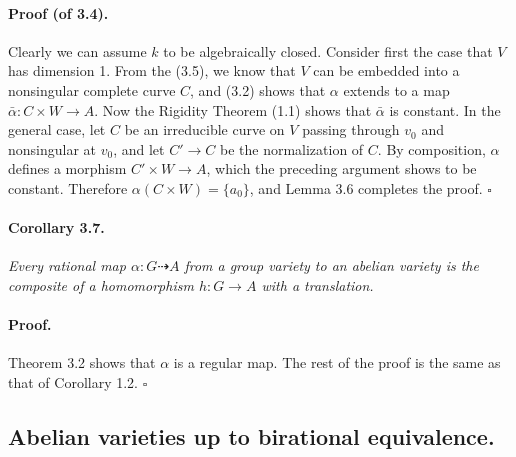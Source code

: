 

\DeclareMathOperator{\Image}{Im}


\paragraph{Proof (of 3.4).}
Clearly we can assume $k$ to be algebraically closed. Consider first the case
that $V$ has dimension 1. From the (3.5), we know that $V$ can be embedded into
a nonsingular complete curve $C$, and (3.2) shows that $\alpha$ extends to a map
$\bar{\alpha}\colon C \times W \to A$. Now the Rigidity Theorem (1.1) shows that
$\bar{\alpha}$ is constant. In the general case, let $C$ be an irreducible curve
on $V$ passing through $v_0$ and nonsingular at $v_0$, and let $C' \to C$ be the
normalization of $C$. By composition, $\alpha$ defines a morphism
$C' \times W \to A$, which the preceding argument shows to be constant.
Therefore $\alpha(C \times W) = \{a_0\}$, and Lemma 3.6 completes the proof.
\hfill $\square$

\paragraph{Corollary 3.7.}
\textit{Every rational map $\alpha\colon G \dashrightarrow A$ from a group
variety to an abelian variety is the composite of a homomorphism
$h\colon G \to A$ with a translation.}

\paragraph{Proof.}
Theorem 3.2 shows that $\alpha$ is a regular map. The rest of the proof is the
same as that of Corollary 1.2. \hfill $\square$

\subsection*{Abelian varieties up to birational equivalence.}

